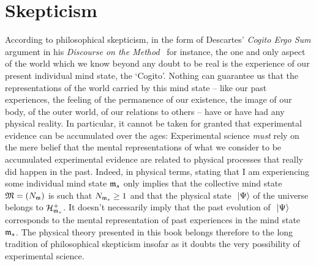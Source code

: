 \documentclass[10pt,a4paper,twoside,openany]{book}
\begin{document}
\section{Skepticism}

According to philosophical skepticism, in the form of Descartes' \textit{Cogito Ergo Sum} argument in his \textit{Discourse on the Method}~\cite{Descartes1637} for instance, the one and only aspect of the world which we know beyond any doubt to be real is the experience of our present individual mind state, the `Cogito'. Nothing can guarantee us that the representations of the world carried by this mind state -- like our past experiences, the feeling of the permanence of our existence, the image of our body, of the outer world, of our relations to others -- have or have had any physical reality. In particular, it cannot be taken for granted that experimental evidence can be accumulated over the ages: Experimental science \textit{must} rely on the mere belief that the mental representations of what we consider to be accumulated experimental evidence are related to physical processes that really did happen in the past. Indeed, in physical terms, stating that I am experiencing some individual mind state $\mathfrak{m}_s$ only implies that the collective mind state $\mathfrak{M} = ({N}_{\mathfrak{m}})$ is such that ${N}_{\mathfrak{m}_s} \geq 1$ and that the physical state $\ \left|{\Psi}\right\rangle$ of the universe belongs to $\mathcal H_{\mathfrak{m}_s}^+$. It doesn't necessarily imply that the past evolution of $\ \left|{\Psi}\right\rangle$ corresponds to the mental representation of past experiences in the mind state $\mathfrak{m}_s$. The physical theory presented in this book belongs therefore to the long tradition of philosophical skepticism insofar as it doubts the very possibility of experimental science.



\end{document}
